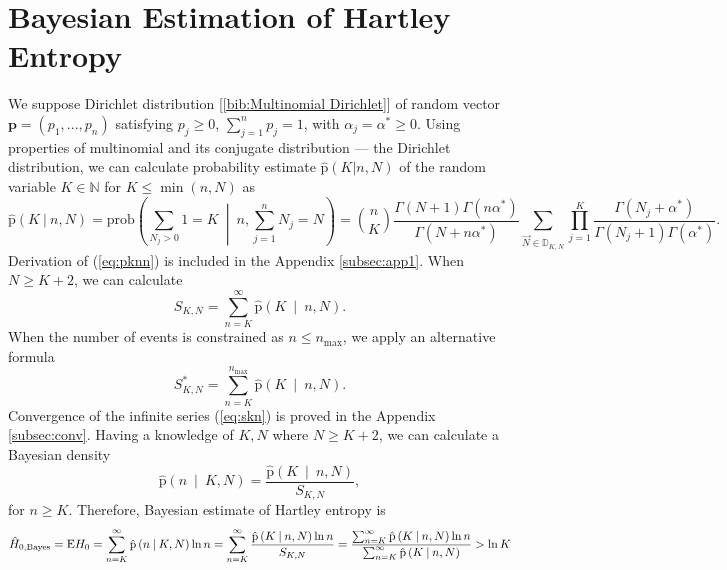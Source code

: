 \section {Bayesian Estimation of Hartley Entropy}
We suppose Dirichlet distribution [\ref{bib:Multinomial Dirichlet}] of random vector $\mathbf{p} = (p_{1},...,p_{n})$ satisfying  $p_{j} \ge 0$, $\sum_{j=1}^{n} p_{j} = 1$, with $\alpha_j = \alpha^{*} \ge 0$. Using properties of multinomial and its conjugate distribution --- the Dirichlet distribution, we can calculate probability estimate $\mathrm{\hat{p}}(K|n,N)$ of the random variable $K \in \mathbb{N}$ for $K \le \min(n,N)$ as 
\begin{equation} 
\label{eq:pknn}
\mathrm{\hat{p}}(K \: | \: n,N) = \text{prob}\left(\sum_{N_{j} > 0}{1}=K \: \middle| \: n,\sum_{j=1}^{n}{N_{j}}=N\right) = {n \choose K} \frac{\Gamma({N+1}) \Gamma(n\alpha^{*})}{\Gamma(N+n\alpha^{*})} \sum_{\vec{N} \in \mathbb{D}_{K,N}} \prod_{j=1}^{K} \frac{ \Gamma(N_{j} + \alpha^{*})}{ \Gamma(N_j+1) \Gamma(\alpha^{*})}.
\end{equation}
Derivation of (\ref{eq:pknn}) is included in the Appendix \ref{subsec:app1}. When $N \ge K+2$, we can calculate 
\begin{equation} 
\label{eq:skn}
S_{K,N} = \sum_{n=K}^{\infty}{\mathrm{\hat{p}}\left(K \: \middle| \: n,N\right)}.
\end{equation}
When the number of events is constrained as $n \leq n_{\text{max}} $, we apply an alternative formula
\begin{equation} 
\label{eq:sknalt}
S_{K,N}^{*} = \sum_{n=K}^{n_{\text{max}}}{\mathrm{\hat{p}}\left(K \: \middle| \: n,N\right)}.
\end{equation}
Convergence of the infinite series (\ref{eq:skn}) is proved in the Appendix \ref{subsec:conv}. Having a knowledge of $K,N$ where $N \ge K+2$, we can calculate a Bayesian density
\begin{equation} 
\label{eq:pnkn}
\mathrm{\hat{p}}\left(n \: \middle| \: K,N \right) = \frac{\mathrm{\hat{p}}\left(K \: \middle| \: n,N\right)}{S_{K,N}},
\end{equation}
for $n \ge K$.
Therefore, Bayesian estimate of Hartley entropy is
\begin{equation} 
\label{eq:hnbayes}
\hat{H}_{0,\mbox{\scriptsize{Bayes}}} = \text{E}H_{0}  = \sum_{n=K}^{\infty}{\mathrm{\hat{p}}\left(n \: \middle| \: K,N\right)\ln{n}} = \sum_{n=K}^{\infty} \frac{\mathrm{\hat{p}}\left(K \: \middle| \: n,N\right)\ln{n}}{S_{K,N}} =  \frac{ \sum_{n=K}^{\infty} \mathrm{\hat{p}}\left(K \: \middle| \: n,N\right)\ln{n}}{\sum_{n=K}^{\infty} \mathrm{\hat{p}}\left(K \: \middle| \: n,N\right)} > \ln{K}
\end{equation}
